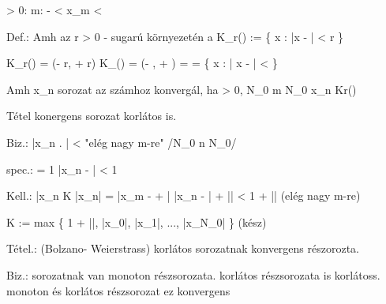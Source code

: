 \forall \epsilon > 0: \exists m: \alpha - \epsilon < x_m < \alpha



Def.:
Amh az \alpha \in {} r > 0 - sugarú környezetén a K_r(\alpha) := \{ x \in {} : |x - \alpha | < r \}

K_r(\alpha) = (\alpha - r, \alpha + r)
K_\epsilon(\alpha) = (\alpha - \epsilon, \alpha + \epsilon) = 
= \{ x \in {} : | x - \alpha | < \epsilon \}

Amh x_n sorozat az \alpha számhoz konvergál, ha \forall > 0, \exists N_0 \in {}
\forall m \geq N_0   x_n \in Kr(\alpha)

Tétel \Forall konergens sorozat korlátos is.

Biz.:
|x_n . \alpha| < \epsilon  "elég nagy m-re" /\esists N_0 \in {} n \geq N_0/

spec.: \epsilon = 1
|x_n - \alpha | < 1

Kell.:
|x_n \leq K  |x_n| = |x_m - \alpha + \alpha| \leq |x_n - \alpha| + |\alpha| < 1 + |\alpha| (elég nagy m-re)

K := max \{ 1 + |\alpha|, |x_0|, |x_1|, ..., |x_N_0| \} (kész)

Tétel.: (Bolzano- Weierstrass)
\forall korlátos sorozatnak \exists konvergens részorozta.

Biz.:
\forall sorozatnak van monoton részsorozata.
\forall korlátos részsorozata is korlátoss. \Rightarrow \exists monoton és korlátos részsorozat \Rightarrow ez konvergens







